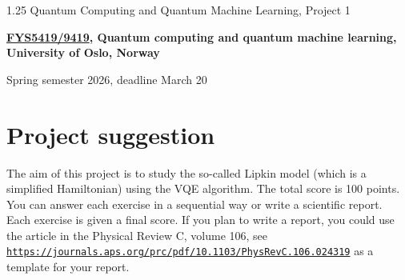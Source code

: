 \documentclass[%
oneside,                 %
final,                   %
10pt]{article}
\begin{document}

\newcommand{\exercisesection}[1]{\subsection*{#1}}






\thispagestyle{empty}

\begin{center}
{\LARGE\bf
\begin{spacing}{1.25}
Quantum Computing and Quantum Machine Learning, Project 1
\end{spacing}
}
\end{center}


\begin{center}
{\bf \href{{https://www.uio.no/studier/emner/matnat/fys/FYS5419/index-eng.html}}{FYS5419/9419}, Quantum computing and quantum machine learning, University of Oslo, Norway${}^{}$} \\ [0mm]
\end{center}

\begin{center}
\end{center}
    

\begin{center}
Spring semester 2026, deadline March 20
\end{center}

\vspace{1cm}


\section{Project suggestion}

The aim of this project is to study the so-called Lipkin model (which is a simplified Hamiltonian) using the VQE algorithm.
The total score is 100 points. You can answer each exercise in a sequential way or write a scientific report. Each exercise is given a final score.
If you plan to write a report, you could use the article in the Physical Review C, volume 106, see \href{{https://journals.aps.org/prc/pdf/10.1103/PhysRevC.106.024319}}{\nolinkurl{https://journals.aps.org/prc/pdf/10.1103/PhysRevC.106.024319}} as a template for your report.
\end{document}
